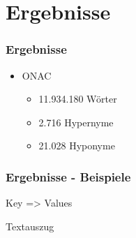 \section{Ergebnisse}
\label{sec:ergebnisse}

\begin{frame}
  \frametitle{Ergebnisse}

  \begin{itemize}
  \item ONAC
    \begin{itemize}
    \item 11.934.180 Wörter
    \item 2.716 Hypernyme
    \item 21.028 Hyponyme
    \end{itemize}
  \end{itemize}
\end{frame}

\begin{frame}
  \frametitle{Ergebnisse - Beispiele}


  Key => Values

  Textauszug
\end{frame}